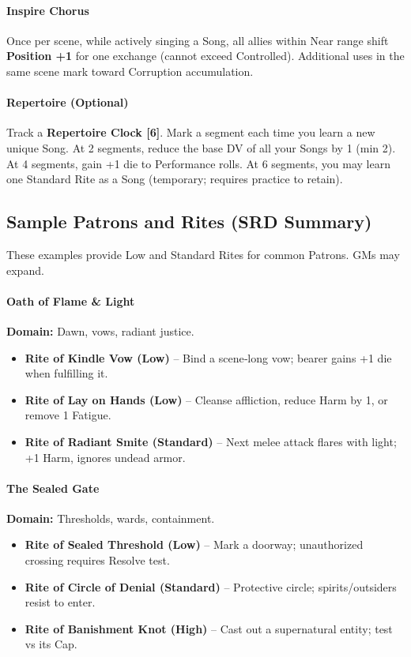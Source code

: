 \paragraph{Inspire Chorus}
Once per scene, while actively singing a Song, all allies within Near range shift \textbf{Position +1} for one exchange (cannot exceed Controlled). Additional uses in the same scene mark toward Corruption accumulation.

\paragraph{Repertoire (Optional)}
Track a \textbf{Repertoire Clock [6]}. Mark a segment each time you learn a new unique Song. At 2 segments, reduce the base DV of all your Songs by 1 (min 2). At 4 segments, gain +1 die to Performance rolls. At 6 segments, you may learn one Standard Rite as a Song (temporary; requires practice to retain).

\subsection{Sample Patrons and Rites (SRD Summary)}

These examples provide Low and Standard Rites for common Patrons. GMs may expand.

\paragraph*{Oath of Flame \& Light}
\textbf{Domain:} Dawn, vows, radiant justice.
\begin{itemize}
  \item \textbf{Rite of Kindle Vow (Low)} -- Bind a scene‑long vow; bearer gains +1 die when fulfilling it.
  \item \textbf{Rite of Lay on Hands (Low)} -- Cleanse affliction, reduce Harm by 1, or remove 1 Fatigue.
  \item \textbf{Rite of Radiant Smite (Standard)} -- Next melee attack flares with light; +1 Harm, ignores undead armor.
\end{itemize}

\paragraph*{The Sealed Gate}
\textbf{Domain:} Thresholds, wards, containment.
\begin{itemize}
  \item \textbf{Rite of Sealed Threshold (Low)} -- Mark a doorway; unauthorized crossing requires Resolve test.
  \item \textbf{Rite of Circle of Denial (Standard)} -- Protective circle; spirits/outsiders resist to enter.
  \item \textbf{Rite of Banishment Knot (High)} -- Cast out a supernatural entity; test vs its Cap.
\end{itemize}

